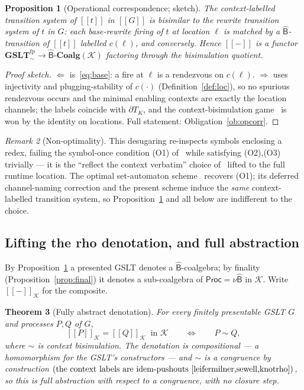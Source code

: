 \documentclass[11pt]{article}
\newcommand{\sem}[1]{[\![#1]\!]}
\newcommand{\Proc}{\mathsf{Proc}}
\newcommand{\dT}{\partial T}
\newcommand{\GSLTfp}{\mathbf{GSLT}^{\mathrm{fp}}_{\!\sim}}
\newcommand{\sB}{\widehat{\mathsf{B}}}
\newcommand{\Ks}{\mathcal{K}}
\theoremstyle{plain}
\newtheorem{theorem}{Theorem}
\newtheorem{proposition}[theorem]{Proposition}
\theoremstyle{definition}
\theoremstyle{remark}
\newtheorem{remark}[theorem]{Remark}
\begin{document}
\begin{proposition}[Operational correspondence; sketch]\label{prop:opcorr}
The context-labelled transition system of $\sem{t}$ in $\sem{G}$ is bisimilar to the rewrite
transition system of $t$ in $G$: each base-rewrite firing of $t$ at location $\ell$ is matched by a
$\sB$-transition of $\sem{t}$ labelled $c(\ell)$, and conversely. Hence $\sem{-}$ is a functor
$\GSLTfp\to\sB\text{-}\mathbf{Coalg}(\Ks)$ factoring through the bisimulation quotient.
\end{proposition}

\begin{proof}[Proof sketch]
$\Leftarrow$ is~\eqref{eq:base}: a fire at $\ell$ is a rendezvous on $c(\ell)$. $\Rightarrow$ uses
injectivity and plugging-stability of $c(\cdot)$ (Definition~\ref{def:loc}), so no spurious rendezvous
occurs and the minimal enabling contexts are exactly the location channels; the labels coincide with
$\dT_K$, and the context-bisimulation game~\cite[Def.~3]{knotrho} is won by the identity on locations.
Full statement: Obligation~\ref{ob:opcorr}.
\end{proof}

\begin{remark}[Non-optimality]\label{rem:nonopt}
This desugaring re-inspects symbols enclosing a redex, failing the symbol-once condition (O1)
of~\cite{optimal} while satisfying (O2),(O3) trivially --- it is the ``reflect the context verbatim''
choice of~\cite[\S3.2]{optimal} lifted to the full runtime location. The optimal set-automaton scheme~\cite{bouwmanerkens} recovers (O1);
its deferred channel-naming correction and the present scheme induce the \emph{same} context-labelled
transition system, so Proposition~\ref{prop:opcorr} and all below are indifferent to the choice.
\end{remark}

\subsection{Lifting the rho denotation, and full abstraction}\label{sec:fullabs}

By Proposition~\ref{prop:opcorr} a presented GSLT denotes a $\sB$-coalgebra; by finality
(Proposition~\ref{prop:final}) it denotes a sub-coalgebra of $\Proc=\nu\sB$ in $\Ks$. Write
$\sem{-}_{\Ks}$ for the composite.

\begin{theorem}[Fully abstract denotation]\label{thm:fullabs}
For every finitely presentable GSLT $G$ and processes $P,Q$ of $G$,
\[
\sem{P}_{\Ks}=\sem{Q}_{\Ks}\ \text{ in }\Ks \qquad\Longleftrightarrow\qquad P\sim Q,
\]
where $\sim$ is context bisimulation. The denotation is compositional --- a homomorphism for the
GSLT's constructors --- and $\sim$ is a congruence by construction
$(\text{the context labels are idem-pushouts~\cite{leifermilner,sewell,knotrho}})$, so this is full
abstraction with respect to a congruence, with no closure step.
\end{theorem}
\end{document}

